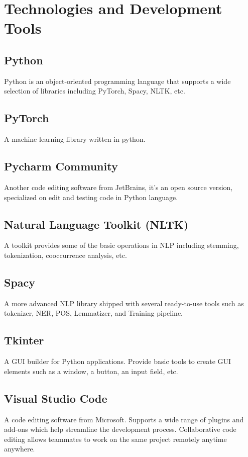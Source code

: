 \documentclass[12pt,oneside,openright,a4paper]{cpe-english-project}
\begin{document}
\section{Technologies and Development Tools}
\subsection{Python} 
Python is an object-oriented programming language that supports a wide selection of libraries including PyTorch, Spacy, NLTK, etc. 
 
\subsection{PyTorch} 
A machine learning library written in python.

\subsection{Pycharm Community} 
Another code editing software from JetBrains, it’s an open source version, specialized on edit and testing code in Python language. 

\subsection{Natural Language Toolkit (NLTK)} 
A toolkit provides some of the basic operations in NLP including stemming, tokenization, cooccurrence analysis, etc. 

\subsection{Spacy} 
A more advanced NLP library shipped with several ready-to-use tools such as tokenizer, NER, POS, Lemmatizer, and Training pipeline.  

\subsection{Tkinter} 
A GUI builder for Python applications. Provide basic tools to create GUI elements such as a window, a button, an input field, etc. 

\subsection{Visual Studio Code} 
A code editing software from Microsoft. Supports a wide range of plugins and add-ons which help streamline the development process. Collaborative code editing allows teammates to work on the same project remotely anytime anywhere. 
\end{document}
